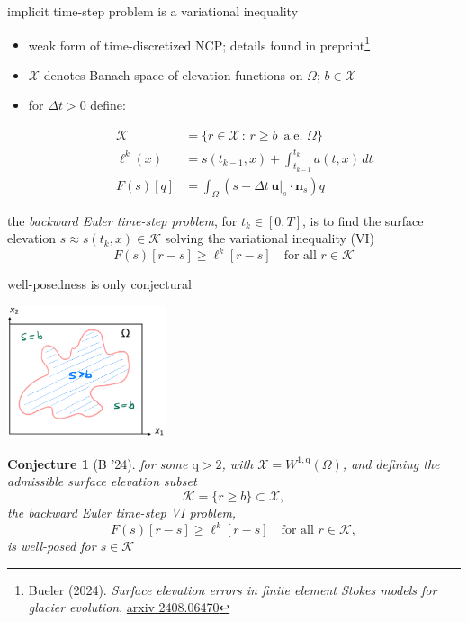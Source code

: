 \documentclass[10pt,svgnames]{beamer}
\newtheorem*{conjecture}{Conjecture}
\newcommand{\bn}{\mathbf{n}}
\newcommand{\bu}{\mathbf{u}}
\newcommand{\cK}{\mathcal{K}}
\newcommand{\cX}{\mathcal{X}}
\newcommand{\qq}{\mathrm{q}}
\begin{document}
\begin{frame}{implicit time-step problem is a variational inequality}

\begin{itemize}
\item weak form of time-discretized NCP; details found in preprint\footnote{Bueler (2024). \emph{Surface elevation errors in finite element Stokes models for glacier evolution}, \href{https://www.arxiv.org/abs/2408.06470}{arxiv 2408.06470}}
\item $\cX$ denotes Banach space of elevation functions on $\Omega$; $b\in\cX$
\item for $\Delta t > 0$ define:

\vspace{-7mm}
\begin{align*}
\cK &= \{r \in \cX\,:\, r \ge b \,\text{ a.e. } \Omega\} \\
\ell^k(x) &= s(t_{k-1},x) + \int_{t_{k-1}}^{t_k} a(t,x)\,dt \\
F(s)[q] &= \int_\Omega (s - \Delta t\,\bu|_s \cdot \bn_s) q 
\end{align*}
\end{itemize}

\medskip
\begin{definition}
the \emph{backward Euler time-step problem}, for $t_k \in [0,T]$, is to find the surface elevation $s \approx s(t_k,x) \in \cK$ solving the variational inequality (VI)
$$F(s)[r-s] \ge \ell^k[r-s] \quad \text{for all } r \in \cK$$
\end{definition}

\bigskip
\end{frame}


\begin{frame}{well-posedness is only conjectural}

\hfill \includegraphics[width=0.35\textwidth]{mapplane}

\begin{conjecture}[B '24]
for some $\qq>2$, with $\cX = W^{1,\qq}(\Omega)$, and defining the admissible surface elevation subset
    $$\cK = \{r \ge b\} \subset \cX,$$
the backward Euler time-step VI problem,
    $$F(s)[r-s] \ge \ell^k[r-s] \quad \text{for all } r \in \cK,$$
is well-posed for $s\in\cK$
\end{conjecture}
\end{frame}
\end{document}
